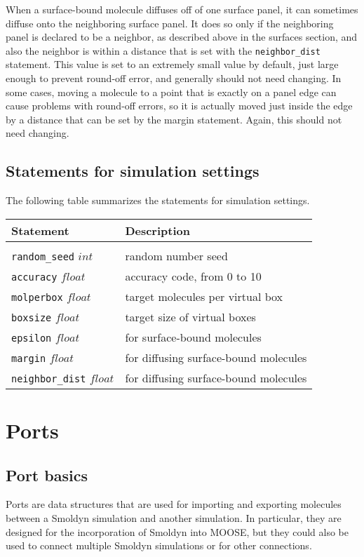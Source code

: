 \documentclass {scrbook}
\newcommand {\ttt} {\texttt}
\begin{document}
When a surface-bound molecule diffuses off of one surface panel, it can sometimes diffuse onto the neighboring surface panel. It does so only if the neighboring panel is declared to be a neighbor, as described above in the surfaces section, and also the neighbor is within a distance that is set with the \ttt{neighbor\_dist} statement. This value is set to an extremely small value by default, just large enough to prevent round-off error, and generally should not need changing. In some cases, moving a molecule to a point that is exactly on a panel edge can cause problems with round-off errors, so it is actually moved just inside the edge by a distance that can be set by the margin statement. Again, this should not need changing.

\section{Statements for simulation settings}

The following table summarizes the statements for simulation settings.

\begin{longtable}[c]{ll}
Statement & Description\\
\hline \\
\ttt{random\_seed} $int$ & random number seed\\
\ttt{accuracy} $float$ & accuracy code, from 0 to 10\\
\ttt{molperbox} $float$ & target molecules per virtual box\\
\ttt{boxsize} $float$ & target size of virtual boxes\\
\ttt{epsilon} $float$ & for surface-bound molecules\\
\ttt{margin} $float$ & for diffusing surface-bound molecules\\
\ttt{neighbor\_dist} $float$ & for diffusing surface-bound molecules
\end{longtable}


\chapter{Ports}

\section{Port basics}

Ports are data structures that are used for importing and exporting molecules between a Smoldyn simulation and another simulation. In particular, they are designed for the incorporation of Smoldyn into MOOSE, but they could also be used to connect multiple Smoldyn simulations or for other connections.
\end{document}

